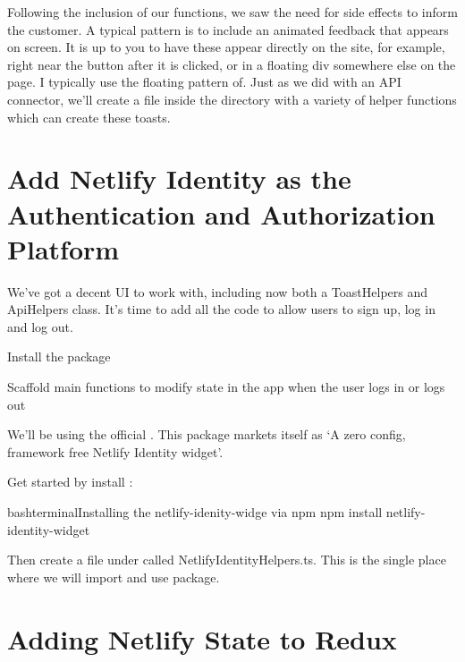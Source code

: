 \documentclass[paper=6in:9in,pagesize=pdftex,headinclude=on,footinclude=on,12pt]{scrbook}
\begin{document}
Following the inclusion of our  functions, we saw the need for side effects to inform the customer. A typical pattern is to include an animated feedback that appears on screen. It is up to you to have these appear directly on the site, for example, right near the button after it is clicked, or in a floating div somewhere else on the page. I typically use the floating pattern of. Just as we did with an API connector, we'll create a file  inside the  directory with a variety of helper functions which can create these toasts.


\section{Add Netlify Identity as the Authentication and Authorization Platform}

We've got a decent UI to work with, including now both a ToastHelpers and ApiHelpers class. It's time to add all the code to allow users to sign up, log in and log out. 

\begin{arrows}
\item Install the  package
\item Scaffold main functions to modify state in the app when the user logs in or logs out
\end{arrows}


We'll be using the official . This package markets itself as `A zero config, framework free Netlify Identity widget'. 


Get started by install :

\begin{codeInput}{bash}{terminal}{Installing the netlify-idenity-widge via npm}
npm install netlify-identity-widget
\end{codeInput}

Then create a file under  called NetlifyIdentityHelpers.ts. This is the single place where we will import and use  package.

\section{Adding Netlify State to Redux}
\end{document}
